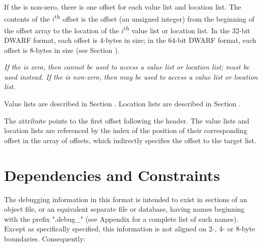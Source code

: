 If the \HFNoffsetentrycount{} is non-zero, there 
is one offset for each 
\bb
value list and 
\eb
location list. The contents
of the $i$\textsuperscript{th} offset is the offset 
(an unsigned integer) from the
beginning of the offset array to the location of the 
$i$\textsuperscript{th} 
\bb
value list or 
\eb
location list. 
In the 32-bit DWARF format, each offset is 4-bytes in size; 
in the 64-bit DWARF format, each offset is 8-bytes in size 
(see Section ).

\textit{If the \HFNoffsetentrycount{} is zero, then \DWFORMloclistx{} cannot 
be used to access a 
\bb
value list or 
\eb
location list; \DWFORMsecoffset{} must be used 
instead. If the \HFNoffsetentrycount{} is non-zero, then \DWFORMloclistx{} 
may be used to access a 
\bb
value list or location 
\eb
list.
\db
}

\bb
Value lists are described in Section .
\eb
Location lists are described in Section .
\db

The \DWATloclistsbase{} attribute points to the first offset 
following the header. The 
\bb
value lists and
\eb
location lists are referenced
by the index of the position of their corresponding offset in the
array of offsets, which indirectly specifies the offset to the
target list.

\section{Dependencies and Constraints}
\label{datarep:dependenciesandconstraints}
The debugging information in this format is intended to
exist in sections of an object file, or an equivalent
separate file or database, having names beginning with
the prefix ".debug\_" (see Appendix 
for a complete list of such names). 
Except as specifically specified, this information is not 
aligned on 2-, 4- or 8-byte boundaries. Consequently:

